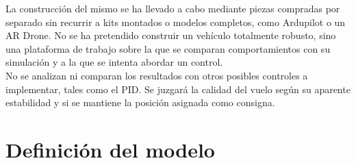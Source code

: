 \documentclass[twoside,11pt]{book}
\begin{document}
La construcción del mismo se ha llevado a cabo mediante piezas compradas por separado sin recurrir a kits montados o modelos completos, como Ardupilot o un AR Drone. No se ha pretendido construir un vehículo totalmente robusto, sino una plataforma de trabajo sobre la que se comparan comportamientos con su simulación y a la que se intenta abordar un control.\\  

No se analizan ni comparan los resultados con otros posibles controles a implementar, tales como el PID. Se juzgará la calidad del vuelo según su aparente estabilidad y si se mantiene la posición asignada como consigna. 

\newpage
\chapter{Definición del modelo} \label{def}
\end{document}
